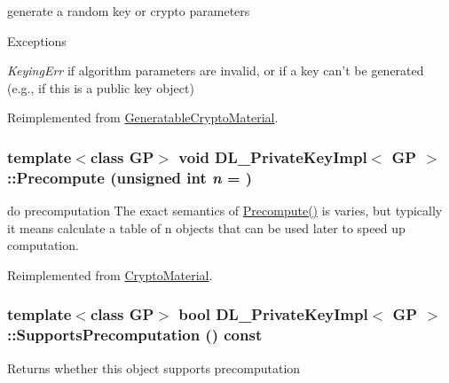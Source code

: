 generate a random key or crypto parameters 
\begin{DoxyExceptions}{Exceptions}
\item[{\em KeyingErr}]if algorithm parameters are invalid, or if a key can't be generated (e.g., if this is a public key object) \end{DoxyExceptions}


Reimplemented from \hyperlink{class_generatable_crypto_material_abe368b52db1ca7079b690f2d6e605f7a}{GeneratableCryptoMaterial}.\hypertarget{class_d_l___private_key_impl_ac1876a3d292e192186070869be896ded}{
\subsubsection[{Precompute}]{\setlength{\rightskip}{0pt plus 5cm}template$<$class GP$>$ void {\bf DL\_\-PrivateKeyImpl}$<$ GP $>$::Precompute (unsigned int {\em n} = {})}}
\label{class_d_l___private_key_impl_ac1876a3d292e192186070869be896ded}


do precomputation The exact semantics of \hyperlink{class_d_l___private_key_impl_ac1876a3d292e192186070869be896ded}{Precompute()} is varies, but typically it means calculate a table of n objects that can be used later to speed up computation. 

Reimplemented from \hyperlink{class_crypto_material_a39e512d2ea70d0e967db98c19994a7fd}{CryptoMaterial}.\hypertarget{class_d_l___private_key_impl_ae8e4b6e0d700c92852a0c3edbb9afaee}{
\subsubsection[{SupportsPrecomputation}]{\setlength{\rightskip}{0pt plus 5cm}template$<$class GP$>$ bool {\bf DL\_\-PrivateKeyImpl}$<$ GP $>$::SupportsPrecomputation () const}}
\label{class_d_l___private_key_impl_ae8e4b6e0d700c92852a0c3edbb9afaee}
\begin{DoxyReturn}{Returns}
whether this object supports precomputation 
\end{DoxyReturn}


